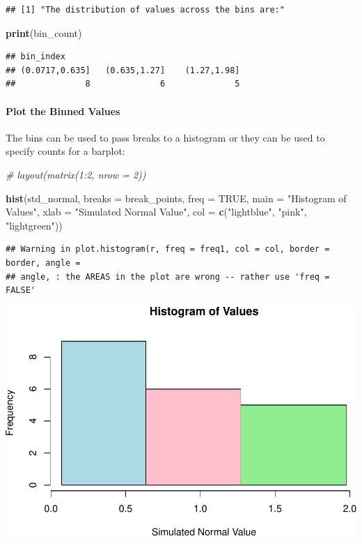 \documentclass[]{article}
\newenvironment{Shaded}{}{}
\newcommand{\CommentTok}[1]{\textcolor[rgb]{0.38,0.63,0.69}{\textit{#1}}}
\newcommand{\DataTypeTok}[1]{\textcolor[rgb]{0.56,0.13,0.00}{#1}}
\newcommand{\KeywordTok}[1]{\textcolor[rgb]{0.00,0.44,0.13}{\textbf{#1}}}
\newcommand{\NormalTok}[1]{#1}
\newcommand{\OtherTok}[1]{\textcolor[rgb]{0.00,0.44,0.13}{#1}}
\newcommand{\StringTok}[1]{\textcolor[rgb]{0.25,0.44,0.63}{#1}}
\let\oldparagraph\paragraph
\renewcommand{\paragraph}[1]{\oldparagraph{#1}\mbox{}}
\begin{document}
\begin{verbatim}
## [1] "The distribution of values across the bins are:"
\end{verbatim}

\begin{Shaded}
\begin{Highlighting}[]
\KeywordTok{print}\NormalTok{(bin_count)}
\end{Highlighting}
\end{Shaded}

\begin{verbatim}
## bin_index
## (0.0717,0.635]   (0.635,1.27]    (1.27,1.98] 
##              8              6              5
\end{verbatim}

\hypertarget{plot-the-binned-values}{%
\paragraph{Plot the Binned Values}\label{plot-the-binned-values}}

The bins can be used to pass breaks to a histogram or they can be used
to specify counts for a barplot:

\begin{Shaded}
\begin{Highlighting}[]
\CommentTok{# layout(matrix(1:2, nrow = 2))}

\KeywordTok{hist}\NormalTok{(std_normal, }\DataTypeTok{breaks =}\NormalTok{ break_points, }\DataTypeTok{freq =} \OtherTok{TRUE}\NormalTok{, }\DataTypeTok{main =} \StringTok{"Histogram of Values"}\NormalTok{, }\DataTypeTok{xlab =} \StringTok{"Simulated Normal Value"}\NormalTok{, }\DataTypeTok{col =} \KeywordTok{c}\NormalTok{(}\StringTok{"lightblue"}\NormalTok{, }\StringTok{"pink"}\NormalTok{, }\StringTok{"lightgreen"}\NormalTok{))}
\end{Highlighting}
\end{Shaded}

\begin{verbatim}
## Warning in plot.histogram(r, freq = freq1, col = col, border = border, angle =
## angle, : the AREAS in the plot are wrong -- rather use 'freq = FALSE'
\end{verbatim}

\includegraphics{./figure/unnamed-chunk-7-1.pdf}
\end{document}
